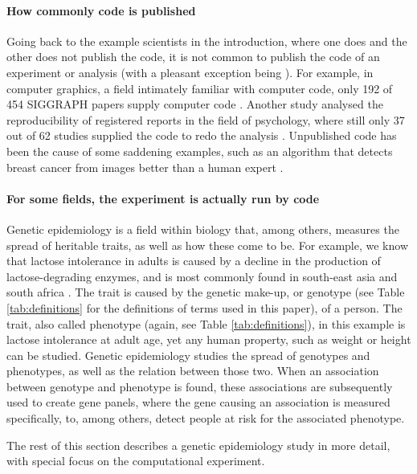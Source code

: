 \paragraph{How commonly code is published}\label{para:how-commonly-code-is-published}

Going back to the example scientists in the introduction,
where one does and the other does not publish the code,
it is not common to publish the code of an experiment or analysis 
\cite{stodden2011trust,read2015sizing} (with a pleasant exception 
being \cite{conesa2019making}).
For example, in computer graphics, 
a field intimately familiar with computer code,
only 192 of 454 SIGGRAPH papers supply computer code \cite{bonneel2020code}.
Another study analysed the reproducibility of registered reports
in the field of psychology, 
where still only 37 out of 62 studies supplied the code 
to redo the analysis \cite{obels2020analysis}.
Unpublished code has been the cause of some saddening examples,
such as an algorithm that detects breast cancer from images 
better than a human expert \cite{haibe2020importance}.

\paragraph{For some fields, the experiment is actually run by code}

Genetic epidemiology is a field within biology that, among 
others, measures the spread of heritable traits,
as well as how these come to be.
For example, we know that lactose intolerance in adults is
caused by a decline in the production of lactose-degrading enzymes,
and is most commonly found in south-east asia and south africa \cite{storhaug2017country}.
The trait is caused by the genetic make-up, 
or genotype 
(see Table \ref{tab:definitions} for the definitions of terms used in this paper), 
of a person.
The trait, also called phenotype (again, see Table \ref{tab:definitions}), 
in this example is lactose intolerance at adult age,
yet any human property, such as weight or height can be studied.
Genetic epidemiology studies the spread of genotypes and phenotypes,
as well as the relation between those two.
When an association between genotype and phenotype is found,
these associations are subsequently used to 
create gene panels, where the gene causing 
an association is measured specifically, to, among others,
detect people at risk for the associated phenotype.

The rest of this section describes a genetic epidemiology study 
in more detail, with special focus on the computational experiment.

